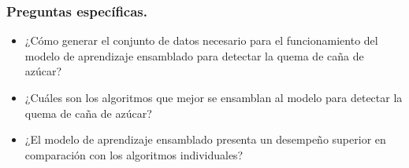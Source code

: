\subsubsection{Preguntas específicas.}
\begin{itemize}
    \item ¿Cómo generar el conjunto de datos necesario para el funcionamiento del modelo de aprendizaje ensamblado para detectar la quema de caña de azúcar?
    \item ¿Cuáles son los algoritmos que mejor se ensamblan al modelo para detectar la quema de caña de azúcar?
    \item ¿El modelo de aprendizaje ensamblado presenta un desempeño superior en comparación con los algoritmos individuales?
\end{itemize}